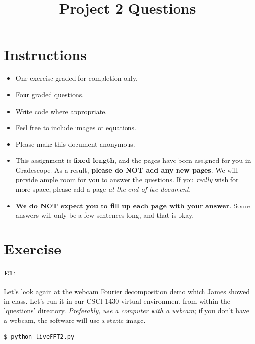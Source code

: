 \title{\vspace{-1cm}Project 2 Questions}



\maketitle
\vspace{-3cm}
\thispagestyle{fancy}

\section*{Instructions}
\begin{itemize}
  \item One exercise graded for completion only.
  \item Four graded questions.
  \item Write code where appropriate.
  \item Feel free to include images or equations.
  \item Please make this document anonymous.
  \item This assignment is \textbf{fixed length}, and the pages have been assigned for you in Gradescope. As a result, \textbf{please do NOT add any new pages}. We will provide ample room for you to answer the questions. If you \emph{really} wish for more space, please add a page \emph{at the end of the document}.
  \item \textbf{We do NOT expect you to fill up each page with your answer.} Some answers will only be a few sentences long, and that is okay.
\end{itemize}


\section*{Exercise}

\paragraph{E1:} Let's look again at the webcam Fourier decomposition demo which James showed in class. Let's run it in our CSCI 1430 virtual environment from within the 'questions' directory. \emph{Preferably, use a computer with a webcam}; if you don't have a webcam, the software will use a static image.

\begin{verbatim}
$ python liveFFT2.py
\end{verbatim}

